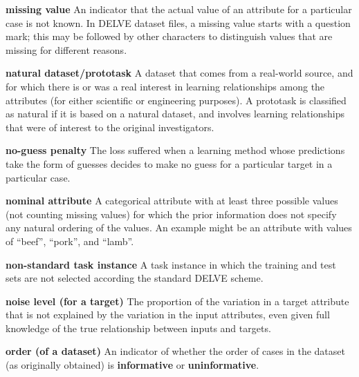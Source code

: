 \begin{list}{}{%
\setlength{\itemsep}{0in}%
\setlength{\leftmargin}{2.25in}%
\setlength{\labelsep}{0in}%
\setlength{\labelwidth}{2.25in}}
\item[\bf missing value \hfill]
An indicator that the actual value of an attribute for a particular case
is not known.  In DELVE dataset files, a missing value starts with
a question mark; this may be followed by other characters to distinguish
values that are missing for different reasons.


\item[\bf natural dataset/prototask \hfill]
A dataset that comes from a real-world source, and for which there
is or was a real interest in learning relationships among the
attributes (for either scientific or engineering purposes).  A
prototask is classified as natural if it is based on a natural
dataset, and involves learning relationships that were of 
interest to the original investigators.

\item[\bf no-guess penalty \hfill]
The loss suffered when a learning method whose predictions take
the form of guesses decides to make no guess for a particular target
in a particular case.

\item[\bf nominal attribute \hfill]
A categorical attribute with at least three possible values (not 
counting missing values) for which the prior information does
not specify any natural ordering of the values.  An example
might be an attribute with values of ``beef'', ``pork'', and ``lamb''.

\item[\bf non-standard task instance \hfill]
A task instance in which the training and test sets are not
selected according the standard DELVE scheme.

\item[\bf noise level (for a target) \hfill]
The proportion of the variation in a target attribute that 
is not explained by the variation in the input attributes, even
given full knowledge of the true relationship between inputs and
targets.

\item[\bf order (of a dataset) \hfill] 
An indicator of whether the order of cases in the dataset (as originally
obtained) is {\bf informative} or {\bf uninformative}.


\end{list}
